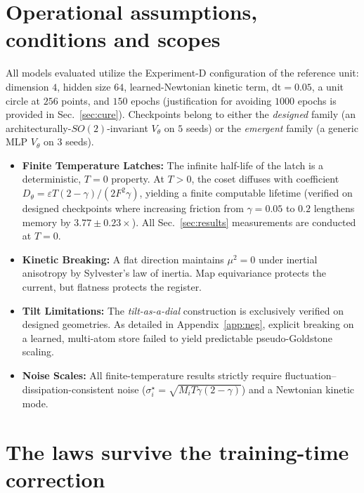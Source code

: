 \documentclass{article}
\begin{document}
\section{Operational assumptions, conditions and scopes}
\label{app:opass}
All models evaluated utilize the Experiment-D configuration of the reference unit: dimension $4$, hidden size $64$, learned-Newtonian kinetic term, $\mathrm{dt}=0.05$, a unit circle at $256$ points, and $150$ epochs (justification for avoiding $1000$ epochs is provided in Sec.~\ref{sec:cure}). Checkpoints belong to either the \emph{designed} family (an architecturally-$SO(2)$-invariant $V_\theta$ on $5$ seeds) or the \emph{emergent} family (a generic MLP $V_\theta$ on $3$ seeds).
\begin{itemize}
    \item \textbf{Finite Temperature Latches:} The infinite half-life of the latch is a deterministic, $T=0$ property. At $T>0$, the coset diffuses with coefficient $D_\theta=\varepsilon T(2-\gamma)/(2F^2\gamma)$, yielding a finite computable lifetime (verified on designed checkpoints where increasing friction from $\gamma=0.05$ to $0.2$ lengthens memory by $3.77\pm0.23\times$). All Sec.~\ref{sec:results} measurements are conducted at $T=0$.
    \item \textbf{Kinetic Breaking:} A flat direction maintains $\mu^2=0$ under inertial anisotropy by Sylvester's law of inertia. Map equivariance protects the current, but flatness protects the register.
    \item \textbf{Tilt Limitations:} The \emph{tilt-as-a-dial} construction is exclusively verified on designed geometries. As detailed in Appendix~\ref{app:neg}, explicit breaking on a learned, multi-atom store failed to yield predictable pseudo-Goldstone scaling.
    \item \textbf{Noise Scales:} All finite-temperature results strictly require fluctuation--dissipation-consistent noise ($\sigma^\star_i=\sqrt{M_iT\gamma(2-\gamma)}$) and a Newtonian kinetic mode.
\end{itemize}

\section{The laws survive the training-time correction}\label{app:anchor}
\end{document}
